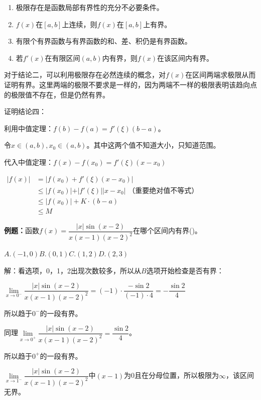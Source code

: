 \documentclass[UTF8, 12pt]{ctexart}
\begin{document}
    \begin{enumerate}
        \item 极限存在是函数局部有界性的充分不必要条件。
        \item $f(x)$在$[a,b]$上连续，则$f(x)$在$[a,b]$上有界。
        \item 有限个有界函数与有界函数的和、差、积仍是有界函数。
        \item 若$f'(x)$在有限区间$(a,b)$内有界，则$f(x)$在该区间内有界。
    \end{enumerate}

    对于结论二，可以利用极限存在必然连续的概念，对$f(x)$在区间两端求极限从而证明有界。这里两端的极限不要求是一样的，因为两端不一样的极限表明该趋向点的极限值不存在，但是仍然有界。

    证明结论四：

    利用中值定理：$f(b)-f(a)=f'(\xi)(b-a)$。

    令$x\in(a,b),x_0\in(a,b)$。其中这两个值不知道大小，只知道范围。

    代入中值定理：$f(x)-f(x_0)=f'(\xi)(x-x_0)$

    $
    \begin{aligned}
        \vert f(x)\vert & =\vert f(x_0)+f'(\xi)(x-x_0)\vert \\
        & \leqslant\vert f(x_0)\vert+\vert f'(\xi)\vert\vert x-x_0\vert\text{ （重要绝对值不等式）} \\
        & \leqslant\vert f(x_0)\vert+K\cdot(b-a) \\
        & \leqslant M
    \end{aligned}
    $

    \textbf{例题：}函数$f(x)=\dfrac{\vert x\vert\sin(x-2)}{x(x-1)(x-2)^2}$在哪个区间内有界()。\medskip

    $A.(-1,0)$\qquad$B.(0,1)$\qquad$C.(1,2)$\qquad$D.(2,3)$\medskip

    解：看选项，0，1，2出现次数较多，所以从$B$选项开始检查是否有界：\medskip

    $\lim\limits_{x\to 0^-}\dfrac{\vert x\vert\sin(x-2)}{x(x-1)(x-2)^2}=(-1)\cdot\dfrac{-\sin 2}{(-1)\cdot 4}=-\dfrac{\sin 2}{4}$\medskip

    所以趋于$0^-$的一段有界。\medskip

    同理$\lim\limits_{x\to 0^+}\dfrac{\vert x\vert\sin(x-2)}{x(x-1)(x-2)^2}=\dfrac{\sin 2}{4}$。\medskip

    所以趋于$0^+$的一段有界。\medskip

    $\lim\limits_{x\to 1^-}\dfrac{\vert x\vert\sin(x-2)}{x(x-1)(x-2)^2}$中$(x-1)$为0且在分母位置，所以极限为$\infty$，该区间无界。\medskip
\end{document}
